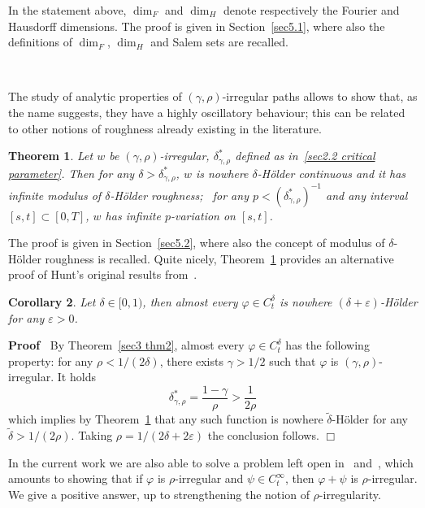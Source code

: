 \documentclass[10pt]{article}
\newenvironment{proof}{\noindent\textbf{Proof\ }}{\hspace*{\fill}$\Box$\medskip}
\newtheorem{theorem}{Theorem}
\newtheorem{corollary}[theorem]{Corollary}
\begin{document}
In the statement above, $\dim_F$ and $\dim_H$ denote respectively the Fourier
and Hausdorff dimensions. The proof is given in Section~\ref{sec5.1}, where
also the definitions of $\dim_F$, $\dim_H$ and Salem sets are recalled.

\

The study of analytic properties of $(\gamma, \rho)$\mbox{-}irregular paths
allows to show that, as the name suggests, they have a highly oscillatory
behaviour; this can be related to other notions of roughness already existing
in the literature.

\begin{theorem}
  \label{sec3 thm3} Let $w$ be $(\gamma, \rho)$\mbox{-}irregular,
  $\delta^{\ast}_{\gamma, \rho}$ defined as in~{\eqref{sec2.2 critical
  parameter}}. Then for any $\delta > \delta^{\ast}_{\gamma, \rho}$, $w$ is
  nowhere $\delta$\mbox{-}H\"{o}lder continuous and it has infinite modulus of
  $\delta$\mbox{-}H\"{o}lder roughness; \ for any $p < (\delta^{\ast}_{\gamma,
  \rho})^{- 1}$ and any interval $[s, t] \subset [0, T]$, $w$ has infinite
  $p$\mbox{-}variation on $[s, t]$.
\end{theorem}

The proof is given in Section~\ref{sec5.2}, where also the concept of modulus
of $\delta$\mbox{-}H\"{o}lder roughness is recalled. Quite nicely,
Theorem~\ref{sec3 thm3} provides an alternative proof of Hunt's original
results from~{\cite{hunt}}.

\begin{corollary}
  \label{sec3 cor1}Let $\delta \in [0, 1)$, then almost every $\varphi \in
  C^{\delta}_t$ is nowhere $(\delta + \varepsilon)$\mbox{-}H\"{o}lder for any
  $\varepsilon > 0$.
\end{corollary}

\begin{proof}
  By Theorem~\ref{sec3 thm2}, almost every $\varphi \in C_t^{\delta}$ has the
  following property: for any $\rho < 1 / (2 \delta)$, there exists $\gamma >
  1 / 2$ such that $\varphi$ is $(\gamma, \rho)$\mbox{-}irregular. It holds
  \[ \delta^{\ast}_{\gamma, \rho} = \frac{1 - \gamma}{\rho} > \frac{1}{2 \rho}
  \]
  which implies by Theorem~\ref{sec3 thm3} that any such function is nowhere
  $\tilde{\delta}$\mbox{-}H\"{o}lder for any $\tilde{\delta} > 1 / (2 \rho)$.
  Taking $\rho = 1 / (2 \delta + 2 \varepsilon)$ the conclusion follows.
\end{proof}

In the current work we are also able to solve a problem left open
in~{\cite{catelliergubinelli}} and~{\cite{choukgubinelli1}}, which amounts to
showing that if $\varphi$ is $\rho$\mbox{-}irregular and $\psi \in
C^{\infty}_t$, then $\varphi + \psi$ is $\rho$\mbox{-}irregular. We give a
positive answer, up to strengthening the notion of $\rho$\mbox{-}irregularity.
\end{document}
